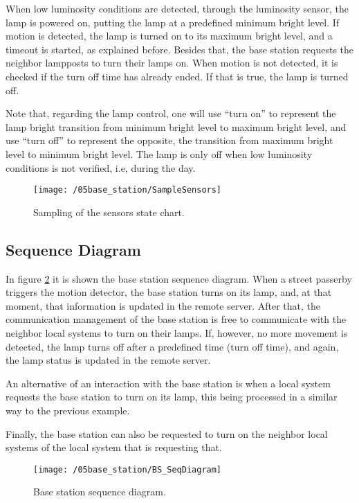 When low luminosity conditions are detected, through the luminosity sensor, the lamp is powered on, putting the lamp at a predefined minimum bright level. If motion is detected, the lamp is turned on to its maximum bright level, and a timeout is started, as explained before. Besides that, the base station requests the neighbor lampposts to turn their lamps on. When motion is not detected, it is checked if the turn off time has already ended. If that is true, the lamp is turned off.

Note that, regarding the lamp control, one will use “turn on” to represent the lamp bright transition from minimum bright level to maximum bright level, and use “turn off” to represent the opposite, the transition from maximum bright level to minimum bright level. The lamp is only off when low luminosity conditions is not verified, i.e, during the day.

\begin{figure}[ht]
	\centering
	\texttt{[image: /05base\_station/SampleSensors]}
	\caption{Sampling of the sensors state chart.}
	\label{fig:sample_sensors}
\end{figure}

\clearpage
\subsection{Sequence Diagram}
In figure \ref{fig:bs_seq_diagram} it is shown the base station sequence diagram. When a street passerby triggers the motion detector, the base station turns on its lamp, and, at that moment, that information is updated in the remote server. After that, the communication management of the base station is free to communicate with the neighbor local systems to turn on their lamps. If, however, no more movement is detected, the lamp turns off after a predefined time (turn off time), and again, the lamp status is updated in the remote server.

An alternative of an interaction with the base station is when a local system requests the base station to turn on its lamp, this being processed in a similar way to the previous example.

Finally, the base station can also be requested to turn on the neighbor local systems of the local system that is requesting that.
\begin{figure}[ht]
	\centering
	\texttt{[image: /05base\_station/BS\_SeqDiagram]}
	\caption{Base station sequence diagram.}
	\label{fig:bs_seq_diagram}
\end{figure}